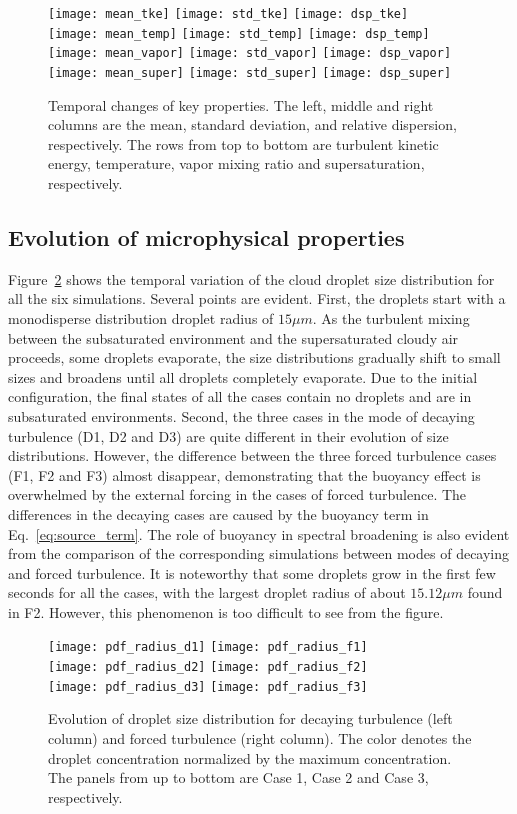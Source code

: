 \documentclass[draft,linenumbers]{agujournal}
\newcommand{\Eq}[1]{Eq.~\eqref{#1}}
\newcommand{\Fig}[1]{Figure~\ref{#1}}
\begin{document}
\begin{figure}[!htbp]\centering
\texttt{[image: mean\_tke]}
\texttt{[image: std\_tke]}
\texttt{[image: dsp\_tke]}\\
\texttt{[image: mean\_temp]}
\texttt{[image: std\_temp]}
\texttt{[image: dsp\_temp]}\\
\texttt{[image: mean\_vapor]}
\texttt{[image: std\_vapor]}
\texttt{[image: dsp\_vapor]}\\
\texttt{[image: mean\_super]}
\texttt{[image: std\_super]}
\texttt{[image: dsp\_super]}
\caption{Temporal changes of key properties. The left, middle and right columns are the mean, standard deviation, and relative dispersion, respectively. The rows from top to bottom are turbulent kinetic energy, temperature, vapor mixing ratio and supersaturation, respectively.\label{fig:therm_dynam}}
\end{figure}

\subsection{Evolution of microphysical properties}
\Fig{fig:rad_distri} shows the temporal variation of the cloud droplet size distribution for all the six simulations. Several points are evident. First, the droplets start with a monodisperse distribution droplet radius of $15\mu m$. As the turbulent mixing between the subsaturated environment and the supersaturated cloudy air proceeds, some droplets evaporate, the size distributions gradually shift to small sizes and broadens until all droplets completely evaporate. Due to the initial configuration, the final states of all the cases contain no droplets and are in subsaturated environments. Second, the three cases in {\color{green}the mode of} decaying turbulence (D1, D2 and D3) are quite different in their evolution of size distributions. However, the difference between the three forced turbulence cases (F1, F2 and F3) almost disappear, demonstrating that the buoyancy effect is overwhelmed by the external forcing {\color{green}in the cases of forced turbulence}. The differences in the decaying cases are caused by the buoyancy term in \Eq{eq:source_term}. The role of buoyancy in spectral broadening is also evident from the comparison of the corresponding simulations between modes of decaying and forced turbulence. {\color{green}It is noteworthy that some droplets grow in the first few seconds for all the cases, with the largest droplet radius of about $15.12\mu m$ found in F2. However, this phenomenon is too difficult to see from the figure.}
\begin{figure}[!htbp]\centering
\texttt{[image: pdf\_radius\_d1]}
\texttt{[image: pdf\_radius\_f1]}\\
\texttt{[image: pdf\_radius\_d2]}
\texttt{[image: pdf\_radius\_f2]}\\
\texttt{[image: pdf\_radius\_d3]}
\texttt{[image: pdf\_radius\_f3]}
\caption{Evolution of droplet size distribution for decaying turbulence (left column) and forced turbulence (right column). The color denotes the droplet concentration normalized by the maximum concentration. The panels from up to bottom are Case 1, Case 2 and Case 3, respectively.} \label{fig:rad_distri}
\end{figure}
\end{document}
